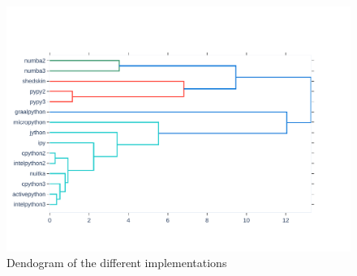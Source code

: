 
\begin{figure}
    \centering
    \includegraphics[width=\linewidth]{imgs/dendogram_interpreters}
    \caption{Dendogram of the different implementations}
    \label{fig:dendogram}
\end{figure}
